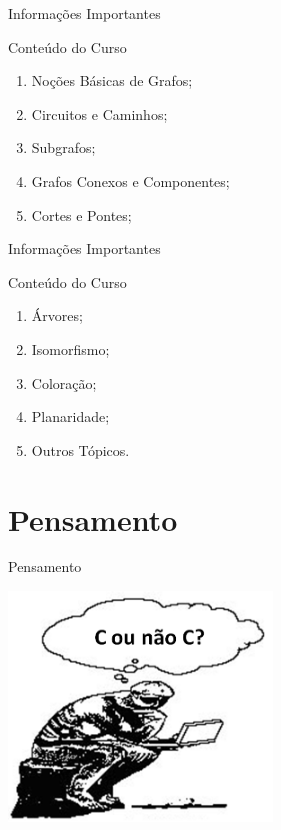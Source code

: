 \documentclass[xcolor=dvipsnames,table]{beamer}
\begin{document}
	\begin{frame}{Informações Importantes}
		\begin{block}{Conteúdo do Curso}
			\begin{enumerate}
				\item Noções Básicas de Grafos;
				\item Circuitos e Caminhos;
				\item Subgrafos;
				\item Grafos Conexos e Componentes;
				\item Cortes e Pontes;
			\end{enumerate}
		\end{block}
	\end{frame}
	
	\begin{frame}{Informações Importantes}
		\begin{block}{Conteúdo do Curso}
			\begin{enumerate}
				\item Árvores;
				\item Isomorfismo;
				\item Coloração;
				\item Planaridade;				
				\item Outros Tópicos.
			\end{enumerate}
		\end{block}
	\end{frame}

	\section{Pensamento}
	\begin{frame}{Pensamento}
  		\begin{center}
    		\includegraphics[width=7cm]{images/pensamento.png}
  		\end{center}
	\end{frame}
	
\end{document}
